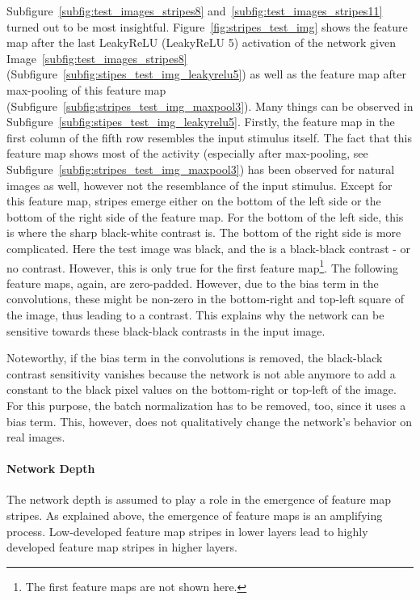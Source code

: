 Subfigure~\ref{subfig:test_images_stripes8} and~\ref{subfig:test_images_stripes11} turned out to be most insightful.
Figure~\ref{fig:stripes_test_img} shows the feature map after the last LeakyReLU (LeakyReLU 5) activation of the network given Image~\ref{subfig:test_images_stripes8} (Subfigure~\ref{subfig:stipes_test_img_leakyrelu5}) as well as the feature map after max-pooling of this feature map (Subfigure~\ref{subfig:stripes_test_img_maxpool3}).
Many things can be observed in Subfigure~\ref{subfig:stipes_test_img_leakyrelu5}.
Firstly, the feature map in the first column of the fifth row resembles the input stimulus itself.
The fact that this feature map shows most of the activity (especially after max-pooling, see Subfigure~\ref{subfig:stripes_test_img_maxpool3}) has been observed for natural images as well, however not the resemblance of the input stimulus.
Except for this feature map, stripes emerge either on the bottom of the left side or the bottom of the right side of the feature map.
For the bottom of the left side, this is where the sharp black-white contrast is.
The bottom of the right side is more complicated.
Here the test image was black, and the  is a black-black contrast - or no contrast.
However, this is only true for the first feature map\footnote{The first feature maps are not shown here.}.
The following feature maps, again, are zero-padded.
However, due to the bias term in the convolutions, these might be non-zero in the bottom-right and top-left square of the image, thus leading to a contrast.
This explains why the network can be sensitive towards these black-black contrasts in the input image.

Noteworthy, if the bias term in the convolutions is removed, the black-black contrast sensitivity vanishes because the network is not able anymore to add a constant to the black pixel values on the bottom-right or top-left of the image.
For this purpose, the batch normalization has to be removed, too, since it uses a bias term.
This, however, does not qualitatively change the network's behavior on real images.

\paragraph{Network Depth}
The network depth is assumed to play a role in the emergence of feature map stripes.
As explained above, the emergence of feature maps is an amplifying process.
Low-developed feature map stripes in lower layers lead to highly developed feature map stripes in higher layers.

